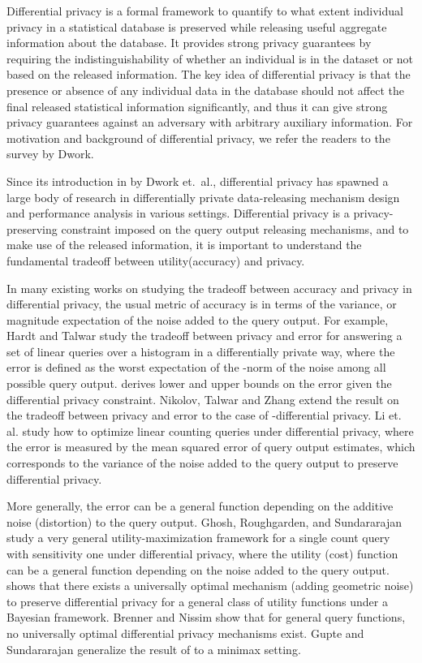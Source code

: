 
Differential privacy is a  formal framework to quantify to what extent individual privacy in a statistical database is preserved while releasing useful aggregate information about the database.
It provides strong privacy guarantees by requiring the indistinguishability of whether an individual is in the dataset or not based on the released information. The key idea of differential privacy is that the presence or absence
of any individual data in the database should not affect the final released statistical information significantly, and thus it can give strong privacy guarantees against an adversary with arbitrary auxiliary information. For motivation and background of differential privacy, we refer the readers to the  survey \cite{DPsurvey} by Dwork.

Since its introduction in \cite{DMNS06} by Dwork et.\ al., differential privacy has spawned  a large body of research in  differentially private data-releasing mechanism design and performance analysis in various settings. Differential privacy is a privacy-preserving constraint imposed on the query output releasing mechanisms, and to make use of the released information, it is important to understand the fundamental tradeoff between utility(accuracy) and privacy.



In many existing works on studying the tradeoff between accuracy and privacy in differential privacy, the usual metric of accuracy is in terms of the variance, or magnitude expectation of the noise added to the query output.  For example, Hardt and Talwar \cite{geometry} study the tradeoff between privacy and error for answering a set of linear queries over a histogram in a differentially private way, where the error is defined as the worst  expectation of the -norm of the noise among all possible query output.  \cite{geometry} derives lower and upper bounds on the error given the differential privacy constraint. Nikolov, Talwar and Zhang \cite{NTZ12} extend the result on the tradeoff between privacy and error to the case of  -differential privacy. Li et. al. \cite{Li10} study how to optimize linear counting queries under differential privacy, where the error is measured by the mean squared error of query output estimates, which corresponds to the variance of the noise added to the query output to preserve differential privacy.

More generally, the error can be a general function depending on the additive noise (distortion) to the query output.  Ghosh, Roughgarden,  and Sundararajan \cite{Ghosh09}  study a very general utility-maximization framework for a single count query with sensitivity one under differential privacy, where the utility (cost) function can be a general function depending on the noise added to the query output. \cite{Ghosh09} shows that there exists a universally optimal mechanism (adding geometric noise) to preserve differential privacy for a general class of utility functions under a Bayesian framework.  Brenner and Nissim \cite{Nissim10} show that for general query functions, no universally optimal differential privacy mechanisms exist. Gupte and Sundararajan  \cite{minimax10} generalize the result of \cite{Ghosh09}  to a minimax setting.


